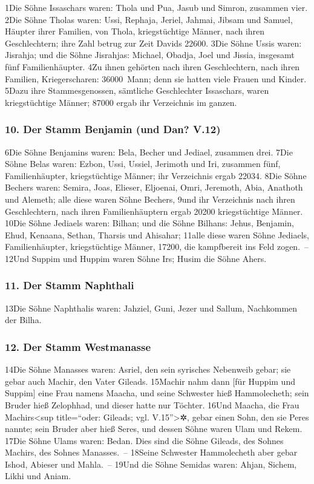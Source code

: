 1Die Söhne Issaschars waren: Thola und Pua, Jasub und Simron, zusammen
vier. 2Die Söhne Tholas waren: Ussi, Rephaja, Jeriel, Jahmai, Jibsam und
Samuel, Häupter ihrer Familien, von Thola, kriegstüchtige Männer, nach
ihren Geschlechtern; ihre Zahl betrug zur Zeit Davids 22600. 3Die Söhne
Ussis waren: Jisrahja; und die Söhne Jisrahjas: Michael, Obadja, Joel
und Jissia, insgesamt fünf Familienhäupter. 4Zu ihnen gehörten nach
ihren Geschlechtern, nach ihren Familien, Kriegerscharen: 36000~Mann;
denn sie hatten viele Frauen und Kinder. 5Dazu ihre Stammesgenossen,
sämtliche Geschlechter Issaschars, waren kriegstüchtige Männer; 87000
ergab ihr Verzeichnis im ganzen.

\hypertarget{der-stamm-benjamin-und-dan-v.12}{%
\subsubsection{10. Der Stamm Benjamin (und Dan?
V.12)}\label{der-stamm-benjamin-und-dan-v.12}}

6Die Söhne Benjamins waren: Bela, Becher und Jediael, zusammen drei.
7Die Söhne Belas waren: Ezbon, Ussi, Ussiel, Jerimoth und Iri, zusammen
fünf, Familienhäupter, kriegstüchtige Männer; ihr Verzeichnis ergab
22034. 8Die Söhne Bechers waren: Semira, Joas, Elieser, Eljoenai, Omri,
Jeremoth, Abia, Anathoth und Alemeth; alle diese waren Söhne Bechers,
9und ihr Verzeichnis nach ihren Geschlechtern, nach ihren
Familienhäuptern ergab 20200 kriegstüchtige Männer. 10Die Söhne Jediaels
waren: Bilhan; und die Söhne Bilhans: Jehus, Benjamin, Ehud, Kenaana,
Sethan, Tharsis und Ahisahar; 11alle diese waren Söhne Jediaels,
Familienhäupter, kriegstüchtige Männer, 17200, die kampfbereit ins Feld
zogen.~-- 12Und Suppim und Huppim waren Söhne Irs; Husim die Söhne
Ahers.

\hypertarget{der-stamm-naphthali}{%
\subsubsection{11. Der Stamm Naphthali}\label{der-stamm-naphthali}}

13Die Söhne Naphthalis waren: Jahziel, Guni, Jezer und Sallum,
Nachkommen der Bilha.

\hypertarget{der-stamm-westmanasse}{%
\subsubsection{12. Der Stamm Westmanasse}\label{der-stamm-westmanasse}}

14Die Söhne Manasses waren: Asriel, den sein syrisches Nebenweib gebar;
sie gebar auch Machir, den Vater Gileads. 15Machir nahm dann {[}für
Huppim und Suppim{]} eine Frau namens Maacha, und seine Schwester hieß
Hammolecheth; sein Bruder hieß Zelophhad, und dieser hatte nur Töchter.
16Und Maacha, die Frau Machirs\textless sup title=``oder: Gileads; vgl.
V.15''\textgreater✲, gebar einen Sohn, den sie Peres nannte; sein Bruder
aber hieß Seres, und dessen Söhne waren Ulam und Rekem. 17Die Söhne
Ulams waren: Bedan. Dies sind die Söhne Gileads, des Sohnes Machirs, des
Sohnes Manasses.~-- 18Seine Schwester Hammolecheth aber gebar Ishod,
Abieser und Mahla.~-- 19Und die Söhne Semidas waren: Ahjan, Sichem,
Likhi und Aniam.

